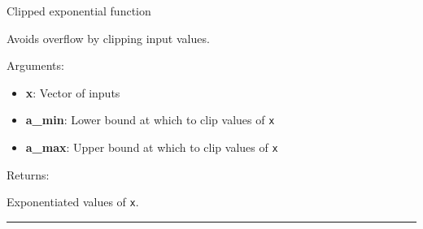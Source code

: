 \begin{Shaded}
\begin{Highlighting}[]
\OperatorTok{=-}\OperatorTok{=}\NormalTok{)}
\end{Highlighting}
\end{Shaded}

Clipped exponential function

Avoids overflow by clipping input values.

Arguments:

\begin{itemize}
\tightlist
\item
  \textbf{x}: Vector of inputs
\item
  \textbf{a\_min}: Lower bound at which to clip values of \texttt{x}
\item
  \textbf{a\_max}: Upper bound at which to clip values of \texttt{x}
\end{itemize}

Returns:

Exponentiated values of \texttt{x}.

\begin{center}\rule{0.5\linewidth}{\linethickness}\end{center}
